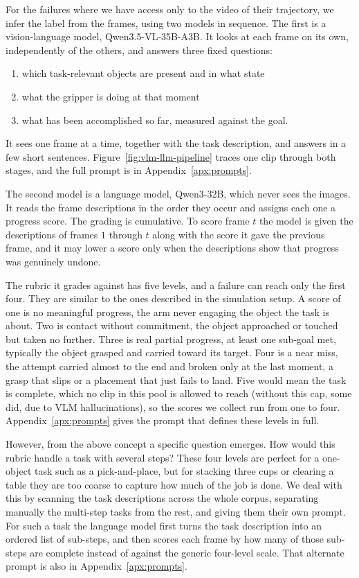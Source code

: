 \label{sec:method-real-failures}

For the failures where we have access only to the video of their trajectory, we infer the label from the frames, using two models in sequence. The first is a vision-language model, Qwen3.5-VL-35B-A3B. It looks at each frame on its own, independently of the others, and answers three fixed questions:
\begin{enumerate}
    \item which task-relevant objects are present and in what state
    \item what the gripper is doing at that moment
    \item what has been accomplished so far, measured against the goal.
\end{enumerate}
It sees one frame at a time, together with the task description, and answers in a few short sentences. Figure~\ref{fig:vlm-llm-pipeline} traces one clip through both stages, and the full prompt is in Appendix~\ref{apx:prompts}.

The second model is a language model, Qwen3-32B, which never sees the images. It reads the frame descriptions in the order they occur and assigns each one a progress score. The grading is cumulative. To score frame $t$ the model is given the descriptions of frames $1$ through $t$ along with the score it gave the previous frame, and it may lower a score only when the descriptions show that progress was genuinely undone.

The rubric it grades against has five levels, and a failure can reach only the first four. They are similar to the ones described in the simulation setup. A score of one is no meaningful progress, the arm never engaging the object the task is about. Two is contact without commitment, the object approached or touched but taken no further. Three is real partial progress, at least one sub-goal met, typically the object grasped and carried toward its target. Four is a near miss, the attempt carried almost to the end and broken only at the last moment, a grasp that slips or a placement that just fails to land. Five would mean the task is complete, which no clip in this pool is allowed to reach (without this cap, some did, due to VLM hallucinations), so the scores we collect run from one to four. Appendix~\ref{apx:prompts} gives the prompt that defines these levels in full.

However, from the above concept a specific question emerges. How would this rubric handle a task with several steps? These four levels are perfect for a one-object task such as a pick-and-place, but for stacking three cups or clearing a table they are too coarse to capture how much of the job is done. We deal with this by scanning the task descriptions across the whole corpus, separating manually the multi-step tasks from the rest, and giving them their own prompt. For such a task the language model first turns the task description into an ordered list of sub-steps, and then scores each frame by how many of those sub-steps are complete instead of against the generic four-level scale. That alternate prompt is also in Appendix~\ref{apx:prompts}.


